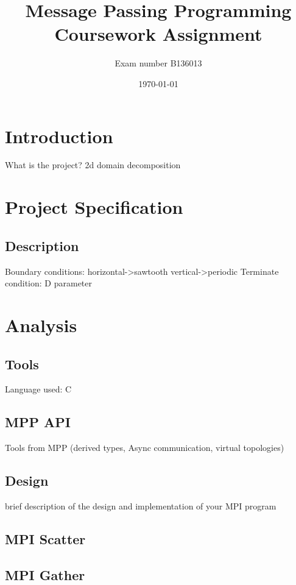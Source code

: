 \documentclass[12pt,a4paper]{article}
\newcommand{\sectionVspacing}{\vspace{15pt}}
\begin{document}
\title{Message Passing Programming Coursework Assignment}
\author{Exam number B136013}
\date{\today}

\makeEPCCtitle

\thispagestyle{empty}

\newpage
\clearpage

\tableofcontents

\newpage
\clearpage

\section{Introduction}
What is the project? 2d domain decomposition

\sectionVspacing

\section{Project Specification}
\subsection{Description}
Boundary conditions: horizontal->sawtooth vertical->periodic
Terminate condition: D parameter

\sectionVspacing

\section{Analysis}

\subsection{Tools}
Language used: C
\subsection{MPP API}
Tools from MPP (derived types, Async communication, virtual topologies)
\subsection{Design}
brief description of the design and implementation of your MPI program
\subsection{MPI Scatter}
\subsection{MPI Gather}
\end{document}
